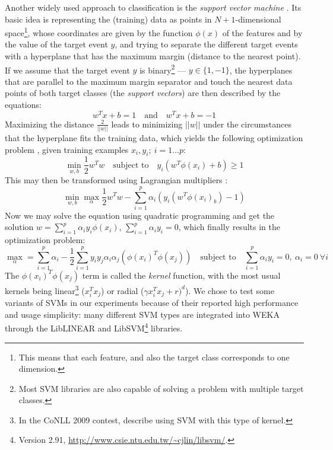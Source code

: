 \documentclass[12pt,notitlepage]{report}
\begin{document}
Another widely used approach to classification is the \emph{support vector machine} \citep{boser92}. Its basic idea is representing the (training) data as points in $N+1$-dimensional space\footnote{This means that each feature, and also the target class corresponds to one dimension.}, whose coordinates are given by the function $\phi(x)$ of the features and by the value of the target event $y$, and trying to separate the different target events with a hyperplane that has the maximum margin (distance to the nearest point). If we assume that the target event $y$ is binary\footnote{Most SVM libraries are also capable of solving a problem with multiple target classes.} --- $y\in \{1,-1\}$, the hyperplanes that are parallel to the maximum margin separator and touch the nearest data points of both target classes (the \emph{support vectors}) are then described by the equations:
\begin{equation}
w^T x + b = 1\quad\mbox{and}\quad w^T x + b = -1
\end{equation}
Maximizing the distance $\frac{2}{||w||}$ leads to minimizing $||w||$ under the circumstances that the hyperplane fits the training data, which yields the following optimization problem \citep{hsu03}, given training examples $x_i,y_i;\ i = 1\dots p$:
\begin{equation}\label{eq:svm-primal}
\min_{w,b} \frac{1}{2}w^T w\quad\mbox{subject to}\quad y_i(w^T\phi(x_i) + b)\geq 1
\end{equation}
This may then be transformed using Lagrangian multipliers \citep{cristianini00}:
\begin{equation}
\min_{w,b} \max_{\alpha} \frac{1}{2}w^T w - \sum_{i=1}^p \alpha_i(y_i(w^T\phi(x_i) _ b) - 1)
\end{equation}
Now we may solve the equation using quadratic programming and get the solution $w = \sum_{i=1}^p \alpha_i y_i \phi(x_i)$, $\sum_{i=1}^p \alpha_i y_i = 0$, which finally results in the optimization problem:
\begin{equation}
\max_{\alpha} = \sum_{i=1}^p \alpha_i - \frac{1}{2}\sum_{i=1}^p y_i y_j \alpha_i \alpha_j (\phi(x_i)^T \phi(x_j))\quad\mbox{subject to}\quad \sum_{i=1}^p \alpha_i y_i = 0,\ \alpha_i = 0\ \forall i
\end{equation}
The $\phi(x_i)^T \phi(x_j)$ term is called the \emph{kernel} function, with the most usual kernels being linear\footnote{In the CoNLL 2009 contest, \citet{che09} describe using SVM with this type of kernel.} ($x_i^T x_j$) or radial ($\gamma x_i^T x_j + r)^d$). We chose to test some variants of SVMs in our experiments because of their reported high performance and usage simplicity: many different SVM types are integrated into WEKA through the LibLINEAR and LibSVM\footnote{Version 2.91, \url{http://www.csie.ntu.edu.tw/\~cjlin/libsvm/}.} \citep{chang01} libraries.
\end{document}
